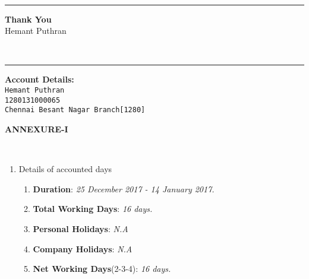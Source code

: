 \documentclass[]{invoice-style}
\begin{document}
\begin{minipage}[t][60em][c]{\textwidth}
\begin{minipage}[][][t]{\textwidth}
	\end{minipage}
		\vspace*{.25em}\\

\vfill
\hrule
	\begin{minipage}[][10em][b]{\textwidth}
	\begin{flushleft}
	{\large \bfseries Thank You}\vspace{.15cm}\\
	{\large  Hemant Puthran}
\end{flushleft}
	\end{minipage}\vspace*{1em}\\
\hrule
	\begin{minipage}[][7em][c]{\textwidth}
	\begin{flushleft}
{\large \bfseries Account Details:}\vspace{.15cm}\\
{\tt \large Hemant Puthran}\\
{\tt \large 1280131000065}\\
{\tt \large Chennai Besant Nagar Branch[1280]}\\


\end{flushleft}
	\end{minipage}

\end{minipage}
\newpage
	\begin{minipage}[][][c]{\textwidth}
		\begin{minipage}[][][c]{\textwidth}
	\begin{center}
	{\Large \textbf{ANNEXURE-\RN{1}}}
	\end{center}
	\end{minipage}
	\vspace{.35cm}\\

	\begin{minipage}[][][c]{\textwidth}
	\begin{enumerate}
		\item Details of accounted days
		\begin{enumerate}[topsep=0pt]\setlength{\itemsep}{0pt}
    \setlength{\parskip}{0pt}
    \setlength{\parsep}{0pt}
\item {\bfseries Duration}: {\itshape 25 December 2017 - 14 January 2017.}
\item {\bfseries Total Working Days}: {\itshape 16 days.}
\item {\bfseries Personal Holidays}: {\itshape N.A}
\item {\bfseries Company Holidays}: {\itshape N.A}
\item {\bfseries Net Working Days}(2-3-4): {\itshape 16 days.}
\end{enumerate}
	\end{enumerate}
	\end{minipage}
	\end{minipage}
\end{document}
